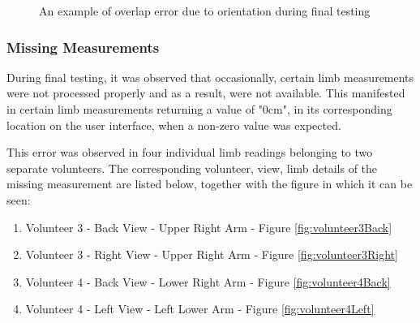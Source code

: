\begin{figure}[ht]
	\centering
	{%
		\setlength{\fboxsep}{0pt}%
		\setlength{\fboxrule}{0.5pt}%
		}
	\caption{An example of overlap error due to orientation during final testing}
	\label{fig:volunteer1Right}
\end{figure}

\subsubsection{Missing Measurements}
During final testing, it was observed that occasionally, certain limb measurements were not processed properly and as a result, were not available. This manifested in certain limb measurements returning a value of "0cm", in its corresponding location on the user interface, when a non-zero value was expected. 

This error was observed in four individual limb readings belonging to two separate volunteers. The corresponding volunteer, view, limb details of the missing measurement are listed below, together with the figure in which it can be seen:

\begin{enumerate}
	\item Volunteer 3 - Back View - Upper Right Arm - Figure \ref{fig:volunteer3Back}
	\item Volunteer 3 - Right View - Upper Right Arm - Figure \ref{fig:volunteer3Right}
	\item Volunteer 4 - Back View - Lower Right Arm - Figure \ref{fig:volunteer4Back}
	\item Volunteer 4 - Left View - Left Lower Arm - Figure \ref{fig:volunteer4Left}
\end{enumerate}	  

